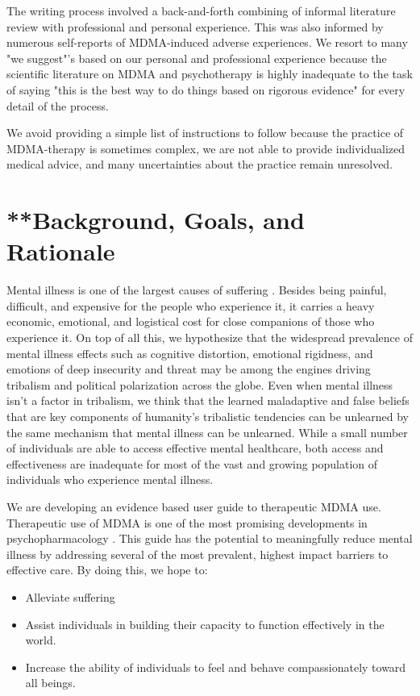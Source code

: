 \documentclass[12pt,letterpaper]{article}
\begin{document}
The writing process involved a back-and-forth combining of informal literature review with professional and personal experience. This was also informed by numerous self-reports of MDMA-induced adverse experiences. We resort to many "we suggest"'s based on our personal and professional experience because the scientific literature on MDMA and psychotherapy is highly inadequate to the task of saying "this is the best way to do things based on rigorous evidence" for every detail of the process. 

We avoid providing a simple list of instructions to follow because the practice of MDMA-therapy is sometimes complex, we are not able to provide individualized medical advice, and many uncertainties about the practice remain unresolved.

\section{**Background, Goals, and Rationale}

Mental illness is one of the largest causes of suffering \cite{mentalhealthpriority}. Besides being painful, difficult, and expensive for the people who experience it, it carries a heavy economic, emotional, and logistical cost for close companions of those who experience it. On top of all this, we hypothesize that the widespread prevalence of mental illness effects such as cognitive distortion, emotional rigidness, and emotions of deep insecurity and threat may be among the engines driving tribalism and political polarization across the globe. Even when mental illness isn't a factor in tribalism, we think that the learned maladaptive and false beliefs that are key components of humanity's tribalistic tendencies \cite{klein2020Polarized} can be unlearned by the same mechanism that mental illness can be unlearned. While a small number of individuals are able to access effective mental healthcare, both access and effectiveness are inadequate for most of the vast and growing population of individuals who experience mental illness.

We are developing an evidence based user guide to therapeutic MDMA use. Therapeutic use of MDMA is one of the most promising developments in psychopharmacology \cite{mitchellMDMAClinicalTrial2}. This guide has the potential to meaningfully reduce mental illness by addressing several of the most prevalent, highest impact barriers to effective care. By doing this, we hope to:
\begin{itemize}
	\item Alleviate suffering
	\item Assist individuals in building their capacity to function effectively in the world.
	\item Increase the ability of individuals to feel and behave compassionately toward all beings.
\end{itemize}
\end{document}
